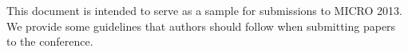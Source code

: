 This document is intended to serve as a sample for submissions to MICRO 2013.
We provide some guidelines that authors should follow when submitting papers to
the conference.
